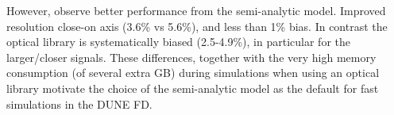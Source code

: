 \documentclass[../main-v1.tex]{subfiles}
\begin{document}
However,  observe better performance from the
semi-analytic model. Improved  resolution close-on axis
(3.6\% vs 5.6\%), and less than 1\% bias. In contrast the
optical library is systematically biased (2.5-4.9\%), in particular for
the larger/closer signals. These differences, together with the very high memory
consumption (of several extra GB) during simulations when using an
optical library motivate the choice of the semi-analytic model as the
default for fast simulations in the DUNE FD.





\end{document}
